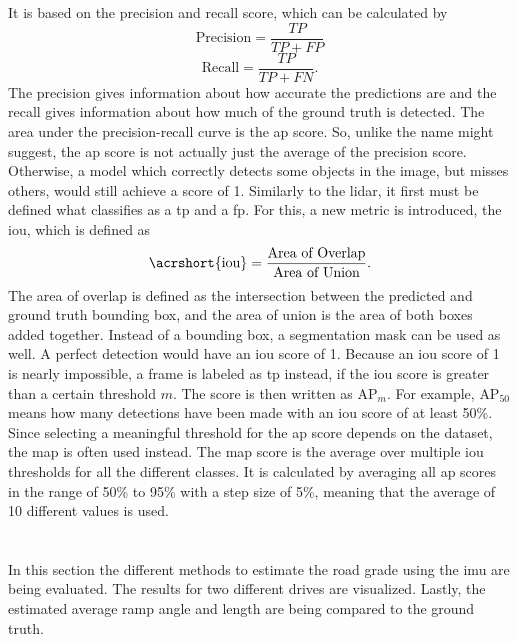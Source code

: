 It is based on the precision and recall score, which can be calculated by
\begin{equation}
	\text{Precision} = \frac{TP}{TP+FP}
\end{equation}
\begin{equation}
	\text{Recall} = \frac{TP}{TP+FN}.
\end{equation}
The precision gives information about how accurate the predictions are and the recall gives information about how much of the ground truth is detected.
The area under the precision-recall curve is the \gls{ap} score.
So, unlike the name might suggest, the \gls{ap} score is not actually just the average of the precision score.
Otherwise, a model which correctly detects some objects in the image, but misses others, would still achieve a score of 1.
Similarly to the \gls{lidar}, it first must be defined what classifies as a \gls{tp} and a \gls{fp}.
For this, a new metric is introduced, the \gls{iou}, which is defined as
\begin{equation}
	\text{\acrshort{iou}} = \frac{\text{Area of Overlap}}{\text{Area of Union}}.
\end{equation}
The area of overlap is defined as the intersection between the predicted and ground truth bounding box, and the area of union is the area of both boxes added together.
Instead of a bounding box, a segmentation mask can be used as well.
A perfect detection would have an \gls{iou} score of 1.
Because an \gls{iou} score of 1 is nearly impossible, a frame is labeled as \gls{tp} instead, if the \gls{iou} score is greater than a certain threshold $m$.
The score is then written as $\text{AP}_{m}$.
For example, $\text{AP}_{50}$ means how many detections have been made with an \gls{iou} score of at least 50\%.
Since selecting a meaningful threshold for the \gls{ap} score depends on the dataset, the \gls{map} is often used instead.
The \gls{map} score is the average over multiple \gls{iou} thresholds for all the different classes.
It is calculated by averaging all \gls{ap} scores in the range of 50\% to 95\% with a step size of 5\%, meaning that the average of 10 different values is used.
\section{}
\label{sec:eval_imu}
In this section the different methods to estimate the road grade using the \gls{imu} are being evaluated.
The results for two different drives are visualized.
Lastly, the estimated average ramp angle and length are being compared to the ground truth.

